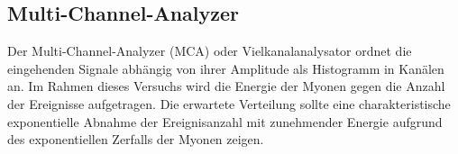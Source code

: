 \subsection*{Multi-Channel-Analyzer}
Der Multi-Channel-Analyzer (MCA) oder Vielkanalanalysator ordnet die eingehenden Signale
abhängig von ihrer Amplitude als Histogramm in Kanälen an.
Im Rahmen dieses Versuchs wird die Energie der Myonen gegen die Anzahl der Ereignisse aufgetragen. 
Die erwartete Verteilung sollte eine charakteristische exponentielle Abnahme der Ereignisanzahl mit 
zunehmender Energie aufgrund des exponentiellen Zerfalls der Myonen zeigen.